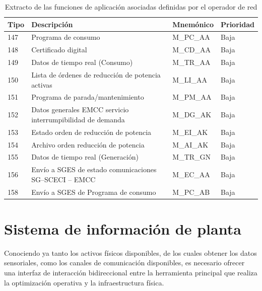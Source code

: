 \begin{table}[ht]
\centering
\begin{tabular}{|l|p{7.5cm}|l|l|}
\hline
Tipo & Descripción                                                & Mnemónico  & Prioridad \\
\hline
147  & Programa de consumo                                        & M\_PC\_AA  & Baja      \\
148  & Certificado digital                                        & M\_CD\_AA  & Baja      \\
149  & Datos de tiempo real (Consumo)                             & M\_TR\_AA  & Baja      \\
150  & Lista de órdenes de reducción de potencia activas          & M\_LI\_AA  & Baja      \\
151  & Programa de parada/mantenimiento                           & M\_PM\_AA  & Baja      \\
152  & Datos generales EMCC servicio interrumpibilidad de demanda & M\_DG\_AK  & Baja      \\
153  & Estado orden de reducción de potencia                      & M\_EI\_AK  & Baja      \\
154  & Archivo orden reducción de potencia                        & M\_AI\_AK  & Baja      \\
155  & Datos de tiempo real (Generación)                          & M\_TR\_GN  & Baja      \\
156  & Envío a SGES de estado comunicaciones SG--SCECI -- EMCC    & M\_EC\_AA  & Baja      \\
158  & Envío a SGES de Programa de consumo                        & M\_PC\_AB  & Baja      \\
\hline
\end{tabular}
\caption{Extracto de las funciones de aplicación asociadas definidas por el operador de red}
\label{tab:funciones-de-aplicación-red}
\end{table}

\section{Sistema de información de planta}
\label{makereference3.4}

Conociendo ya tanto los activos físicos disponibles, de los cuales obtener los datos sensoriales, como los canales de comunicación disponibles, es necesario ofrecer una interfaz de interacción bidireccional entre la herramienta principal que realiza la optimización operativa y la infraestructura física.

